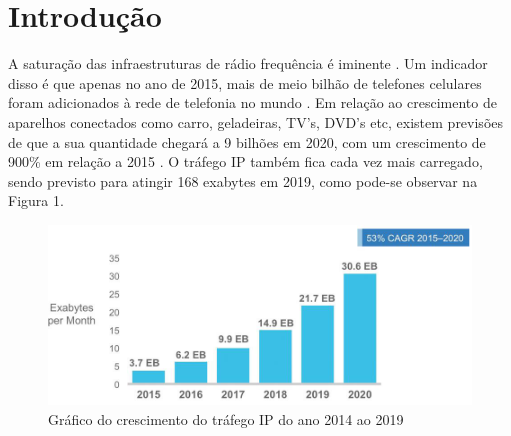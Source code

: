 \documentclass[
12pt,				%
openright,			%
twoside,			%
a4paper,			%
hyphens,
english,			%
french,				%
spanish,			%
brazil				%
]{abntex2}
\begin{document}
		\tableofcontents*
		\cleardoublepage
		
		
		
		\textual
		
		\chapter*[Introdução]{Introdução}
		A saturação das infraestruturas de rádio frequência é iminente \cite{load-balancing}. Um indicador disso é que apenas no ano de 2015, mais de meio bilhão de telefones celulares foram adicionados à rede de telefonia no mundo \cite{cisco-forecast}. Em relação ao crescimento de aparelhos conectados como carro, geladeiras, TV’s, DVD’s etc, existem previsões de que a sua quantidade chegará a 9 bilhões em 2020, com um crescimento 	de 900\% em relação a 2015 \cite{ibge1993}. O tráfego IP também fica cada vez mais carregado, sendo previsto para atingir 168 exabytes em 2019, como pode-se observar na Figura 1.
		
		\begin{figure}[!htb]
			\caption{\label{fig_cisco}Gráfico do crescimento do tráfego IP do ano 2014 ao 2019}
			\begin{center}
				\includegraphics[scale=0.5]{cisco_exabytes_per_month.png}
			\end{center}
		\end{figure}
		
\end{document}
